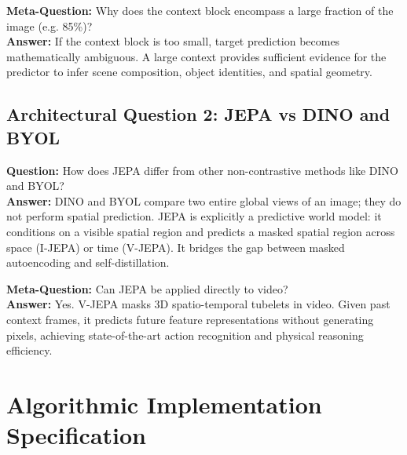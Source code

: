\documentclass[11pt,a4paper]{article}
\theoremstyle{definition}
\begin{document}
\textbf{Meta-Question:} Why does the context block encompass a large fraction of the image (e.g. 85\%)?\\
\textbf{Answer:} If the context block is too small, target prediction becomes mathematically ambiguous. A large context provides sufficient evidence for the predictor to infer scene composition, object identities, and spatial geometry.

\subsection{Architectural Question 2: JEPA vs DINO and BYOL}
\textbf{Question:} How does JEPA differ from other non-contrastive methods like DINO and BYOL?\\
\textbf{Answer:} DINO and BYOL compare two entire global views of an image; they do not perform spatial prediction. JEPA is explicitly a predictive world model: it conditions on a visible spatial region and predicts a masked spatial region across space (I-JEPA) or time (V-JEPA). It bridges the gap between masked autoencoding and self-distillation.

\textbf{Meta-Question:} Can JEPA be applied directly to video?\\
\textbf{Answer:} Yes. V-JEPA masks 3D spatio-temporal tubelets in video. Given past context frames, it predicts future feature representations without generating pixels, achieving state-of-the-art action recognition and physical reasoning efficiency.

\section{Algorithmic Implementation Specification}
\end{document}
